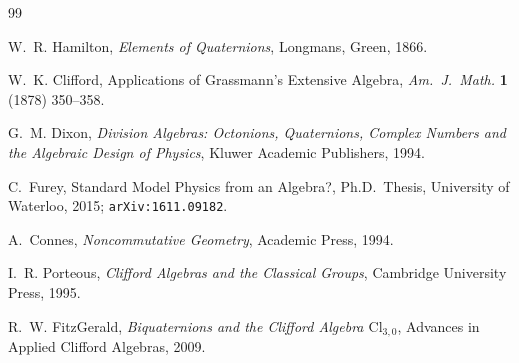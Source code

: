 \documentclass[12pt,a4paper]{article}
\theoremstyle{remark}
\begin{document}
\begin{thebibliography}{99}

W.~R. Hamilton,
\emph{Elements of Quaternions},
Longmans, Green, 1866.

W.~K. Clifford,
Applications of Grassmann's Extensive Algebra,
\emph{Am.\ J.\ Math.} \textbf{1} (1878) 350--358.

G.~M. Dixon,
\emph{Division Algebras: Octonions, Quaternions, Complex Numbers and the
Algebraic Design of Physics},
Kluwer Academic Publishers, 1994.

C.~Furey,
Standard Model Physics from an Algebra?,
Ph.D.\ Thesis, University of Waterloo, 2015; \texttt{arXiv:1611.09182}.

A.~Connes,
\emph{Noncommutative Geometry},
Academic Press, 1994.

I.~R. Porteous,
\emph{Clifford Algebras and the Classical Groups},
Cambridge University Press, 1995.

R.~W. FitzGerald,
\emph{Biquaternions and the Clifford Algebra $\mathrm{Cl}_{3,0}$},
Advances in Applied Clifford Algebras, 2009.

\end{thebibliography}
\end{document}
